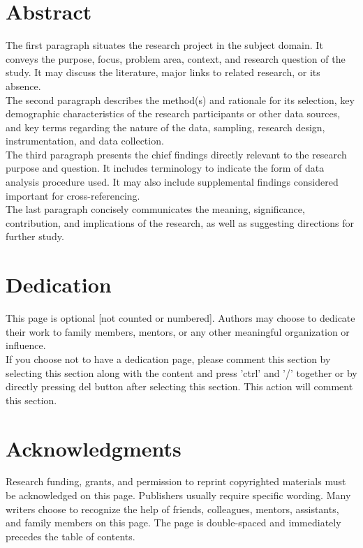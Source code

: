 \documentclass[12pt]{report}
\begin{document}
\chapter*{Abstract}
The first paragraph situates the research project in the subject domain. It conveys the purpose, focus, problem area, context, and research question of the study. It may discuss the literature, major links to related research, or its absence.
\\
The second paragraph describes the method(s) and rationale for its selection, key demographic characteristics of the research participants or other data sources, and key terms regarding the nature of the data, sampling, research design, instrumentation, and data collection.
\\
The third paragraph presents the chief findings directly relevant to the research purpose and question. It includes terminology to indicate the form of data analysis procedure used. It may also include supplemental findings considered important for cross-referencing.
\\
The last paragraph concisely communicates the meaning, significance, contribution, and implications of the research, as well as suggesting directions for further study. \\

\chapter*{Dedication}
This page is optional [not counted or numbered]. Authors may choose to dedicate their work to family members, mentors, or any other meaningful organization or influence.
\\
If you choose not to have a dedication page, please comment this section by selecting this section along with the content and press 'ctrl' and '/' together or by directly pressing del button after selecting this section. This action will comment this section.
\chapter*{Acknowledgments}
Research funding, grants, and permission to reprint copyrighted materials must be acknowledged on this page. Publishers usually require specific wording. Many writers choose to recognize the help of friends, colleagues, mentors, assistants, and family members on this page. The page is double-spaced and immediately precedes the table of contents.
\end{document}
